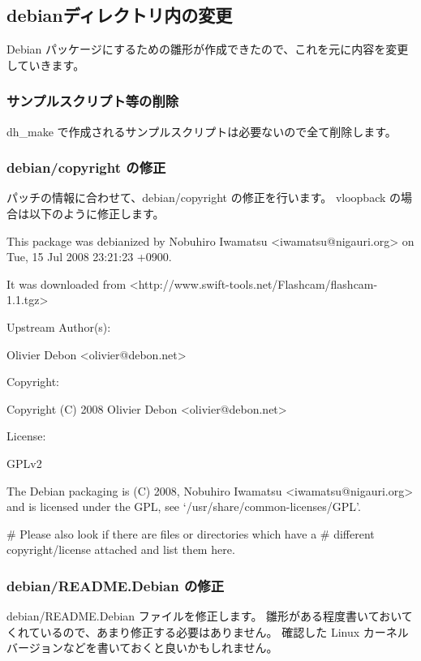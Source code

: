 \documentclass[mingoth,a4paper]{jsarticle}
\begin{document}
\subsection{debianディレクトリ内の変更}
Debian パッケージにするための雛形が作成できたので、これを元に内容を変更していきます。

\subsubsection{サンプルスクリプト等の削除}
dh\_make で作成されるサンプルスクリプトは必要ないので全て削除します。

\subsubsection{debian/copyright の修正}
パッチの情報に合わせて、debian/copyright の修正を行います。
vloopback の場合は以下のように修正します。

\begin{commandline}
This package was debianized by Nobuhiro Iwamatsu <iwamatsu@nigauri.org> on
Tue, 15 Jul 2008 23:21:23 +0900.

It was downloaded from <http://www.swift-tools.net/Flashcam/flashcam-1.1.tgz>

Upstream Author(s):

    Olivier Debon <olivier@debon.net>

Copyright:

    Copyright (C) 2008 Olivier Debon <olivier@debon.net>

License:

    GPLv2

The Debian packaging is (C) 2008, Nobuhiro Iwamatsu <iwamatsu@nigauri.org> and
is licensed under the GPL, see `/usr/share/common-licenses/GPL'.

# Please also look if there are files or directories which have a
# different copyright/license attached and list them here.
\end{commandline}

\subsubsection{debian/README.Debian の修正}
debian/README.Debian ファイルを修正します。
雛形がある程度書いておいてくれているので、あまり修正する必要はありません。
確認した Linux カーネルバージョンなどを書いておくと良いかもしれません。
\end{document}

